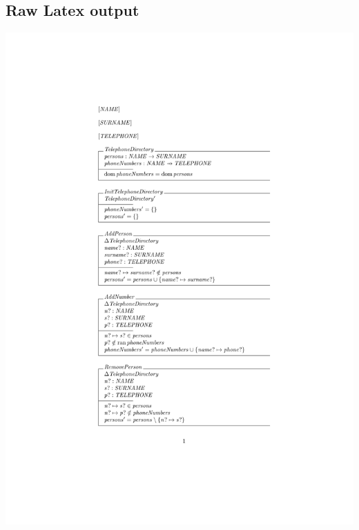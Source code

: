 %
\subsection{Raw Latex output}
%
\noindent \includegraphics[clip, trim=4cm 5.5cm 4cm 4.2cm, scale=0.9]{examples/nonworkzdra/0.pdf}

